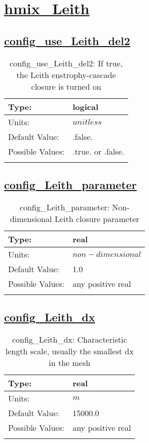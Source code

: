 \section[hmix\_Leith]{\hyperref[sec:nm_tab_hmix_Leith]{hmix\_Leith}}
\label{sec:nm_sec_hmix_Leith}
\subsection[config\_use\_Leith\_del2]{\hyperref[sec:nm_tab_hmix_Leith]{config\_use\_Leith\_del2}}
\label{subsec:nm_sec_config_use_Leith_del2}
\begin{center}
\begin{longtable}{| p{2.0in} | p{4.0in} |}
    \hline
    Type: & logical \\
    \hline
    Units: & $unitless$ \\
    \hline
    Default Value: & .false. \\
    \hline
    Possible Values: & .true. or .false. \\
    \hline
    \caption{config\_use\_Leith\_del2: If true, the Leith enstrophy-cascade closure is turned on}
\end{longtable}
\end{center}
\subsection[config\_Leith\_parameter]{\hyperref[sec:nm_tab_hmix_Leith]{config\_Leith\_parameter}}
\label{subsec:nm_sec_config_Leith_parameter}
\begin{center}
\begin{longtable}{| p{2.0in} | p{4.0in} |}
    \hline
    Type: & real \\
    \hline
    Units: & $non-dimensional$ \\
    \hline
    Default Value: & 1.0 \\
    \hline
    Possible Values: & any positive real \\
    \hline
    \caption{config\_Leith\_parameter: Non-dimensional Leith closure parameter}
\end{longtable}
\end{center}
\subsection[config\_Leith\_dx]{\hyperref[sec:nm_tab_hmix_Leith]{config\_Leith\_dx}}
\label{subsec:nm_sec_config_Leith_dx}
\begin{center}
\begin{longtable}{| p{2.0in} | p{4.0in} |}
    \hline
    Type: & real \\
    \hline
    Units: & $m$ \\
    \hline
    Default Value: & 15000.0 \\
    \hline
    Possible Values: & any positive real \\
    \hline
    \caption{config\_Leith\_dx: Characteristic length scale, usually the smallest dx in the mesh}
\end{longtable}
\end{center}
